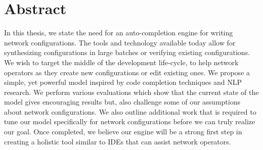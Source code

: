 
\chapter*{Abstract}
In this thesis, we state the need for an auto-completion engine for writing network configurations. The tools and technology available today allow for synthesizing configurations in large batches or verifying existing configurations. We wish to target the middle of the development life-cycle, to help network operators as they create new configurations or edit existing ones. We propose a simple, yet powerful model inspired by code completion techniques and NLP research. We perform various evaluations which show that the current state of the model gives encouraging results but, also challenge some of our assumptions about network configurations. We also outline additional work that is required to tune our model specifically for network configurations before we can truly realize our goal. Once completed, we believe our engine will be a strong first step in creating a holistic tool similar to IDEs that can assist network operators.
